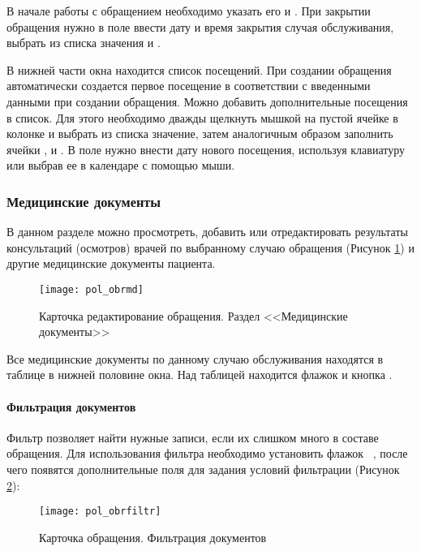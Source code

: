 В начале работы с обращением необходимо указать его  и . При закрытии обращения нужно в поле  ввести дату и время закрытия случая обслуживания, выбрать из списка значения  и .

В нижней части окна находится список посещений. При создании обращения автоматически создается первое посещение в соответствии с введенными данными при создании обращения. Можно добавить дополнительные посещения в список. Для этого необходимо дважды щелкнуть мышкой на пустой ячейке в колонке  и выбрать из списка значение, затем аналогичным образом заполнить ячейки ,  и . В поле  нужно внести дату нового посещения, используя клавиатуру или выбрав ее в календаре с помощью мыши.

\subsubsection{Медицинские документы} \label{pol_obr_md}

В данном разделе можно просмотреть, добавить или отредактировать результаты консультаций (осмотров) врачей по выбранному случаю обращения (Рисунок \ref{img_pol_obrmd}) и другие медицинские документы пациента.

\begin{figure}[ht]\centering
 \texttt{[image: pol\_obrmd]}
 \caption{Карточка редактирование обращения. Раздел <<Медицинские документы>>}
 \label{img_pol_obrmd}
\end{figure}

Все медицинские документы по данному случаю обслуживания находятся в таблице в нижней половине окна. Над таблицей находится флажок  и кнопка .

\paragraph{Фильтрация документов} \label{pol_obr_mdfiltr}

Фильтр позволяет найти нужные записи, если их слишком много в составе обращения. Для использования фильтра необходимо установить флажок \putx~, после чего появятся дополнительные поля для задания условий фильтрации (Рисунок \ref{img_pol_obrfiltr}):

\begin{figure}[ht]\centering
 \texttt{[image: pol\_obrfiltr]}
 \caption{Карточка обращения. Фильтрация документов}
 \label{img_pol_obrfiltr}
\end{figure}

